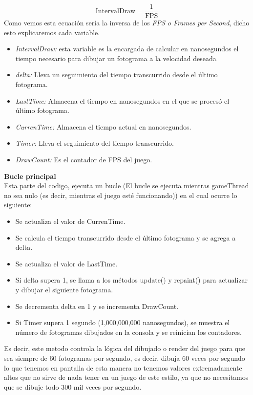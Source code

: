 \documentclass[a4paper]{article}
\begin{document}
$$\text{IntervalDraw} = \frac{1}{\text{FPS}}$$
Como vemos esta ecuación sería la inversa de los \textit{FPS o Frames per Second}, dicho esto explicaremos cada variable.
\begin{itemize}
    \item \textit{IntervalDraw:} esta variable es la encargada de calcular en nanosegundos el tiempo necesario para dibujar un fotograma a la velocidad deseada
    \item \textit{delta:} Lleva un seguimiento del tiempo transcurrido desde el último fotograma.
    \item \textit{LastTime:} Almacena el tiempo en nanosegundos en el que se procesó el último fotograma.
    \item \textit{CurrenTime:} Almacena el tiempo actual en nanosegundos.
    \item \textit{Timer:} Lleva el seguimiento del tiempo transcurrido.
    \item \textit{DrawCount:} Es el contador de FPS del juego.
\end{itemize}
\textbf{Bucle principal}\\
Esta parte del codigo, ejecuta un bucle (El bucle se ejecuta mientras gameThread no sea nulo (es decir, mientras el juego esté funcionando)) en el cual ocurre lo siguiente:
\begin{itemize}
    \item Se actualiza el valor de CurrenTime.
    \item Se calcula el tiempo transcurrido desde el último fotograma y se agrega a delta.
    \item Se actualiza el valor de LastTime.
    \item Si delta supera 1, se llama a los métodos update() y repaint() para actualizar y dibujar el siguiente fotograma.
    \item Se decrementa delta en 1 y se incrementa DrawCount.
    \item Si Timer supera 1 segundo (1,000,000,000 nanosegundos), se muestra el número de fotogramas dibujados en la consola y se reinician los contadores.
\end{itemize}
Es decir, este metodo controla la lógica del dibujado o render del juego para que sea siempre de 60 fotogramas por segundo, es decir, dibuja 60 veces por segundo lo que tenemos en pantalla
de esta manera no tenemos valores extremadamente altos que no sirve de nada tener en un juego de este estilo, ya que no necesitamos que se dibuje todo 300 mil veces por segundo.\\
\end{document}

